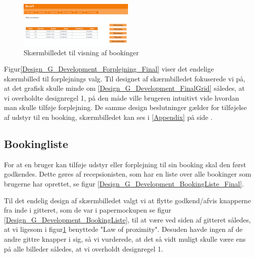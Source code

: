 \begin{figure}[h!]
  \centering
    \includegraphics[width=0.5\textwidth]{Appendix/GUI-Prototype/DigitalMockup/DineBookinger}
  \caption{Skærmbilledet til visning af bookinger}
\label{Design_G_Development_YourBookings_Final}
\end{figure} 

Figur\ref{Design_G_Development_Forplejning_Final} viser det endelige skærmbilled til forplejnings valg. Til designet af skærmbilledet fokuserede vi på, at det grafisk skulle minde om \ref{Design_G_Development_FinalGrid} således, at vi overholdte designregel 1, på den måde ville brugeren intuitivt vide hvordan man skulle tilføje forplejning. De samme design beslutninger gælder for tilføjelse af udstyr til en booking, skærmbilledet kan ses i  \ref{Appendix} på side \pageref{Appendix}.

\subsection{Bookingliste}
For at en bruger kan tilføje udstyr eller forplejning til sin booking skal den først godkendes. Dette gøres af recepsionisten, som har en liste over alle bookinger som brugerne har oprettet, se figur \ref{Design_G_Development_BookingListe_Final}.

Til det endelig design af skærmbilledet valgt vi at flytte godkend/afvis knapperne fra inde i gitteret, som de var i papermockupen se figur \ref{Design_G_Development_BookingListe}, til at være ved siden af gitteret således, at vi ligesom i figur\ref{Design_G_Development_YourBookings_Final} benyttede "Law of proximity". Desuden havde ingen af de andre gittre knapper i sig, så vi vurderede, at det så vidt muligt skulle være ens på alle billeder således, at vi overholdt designregel 1.

